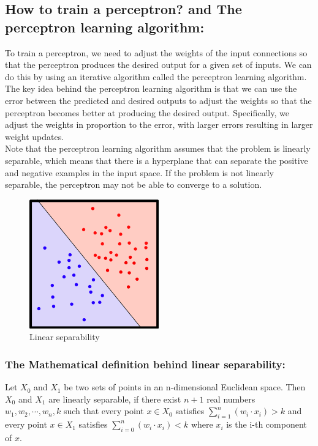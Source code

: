 \documentclass[12pt]{article}
\begin{document}
\subsection{How to train a perceptron? and The perceptron learning algorithm:}
To train a perceptron, we need to adjust the weights of the input connections so that the
perceptron produces the desired output for a given set of inputs. We can do this by using an
iterative algorithm called the perceptron learning algorithm.\\
The key idea behind the perceptron learning algorithm is that we can use the error between the
predicted and desired outputs to adjust the weights so that the perceptron becomes better at
producing the desired output. Specifically, we adjust the weights in proportion to the error, with
larger errors resulting in larger weight updates.\\
Note that the perceptron learning algorithm assumes that the problem is linearly separable, which
means that there is a hyperplane that can separate the positive and negative examples in the input
space. If the problem is not linearly separable, the perceptron may not be able to converge to a
solution.\\
\begin{figure}[h]
  \centering
  \includegraphics{linearly.png}
  \caption{Linear separability}
\end{figure}
\subsubsection{The Mathematical definition behind linear separability:}
Let $X_0$ and $X_1$ be two sets of points in an n-dimensional Euclidean space. Then $X_0$ and $X_1$
are linearly separable, if there exist $n + 1$ real numbers $w_1, w_2, \cdots, w_n, k$ such that
every point $x \in X_0$ satisfies $\sum_{i = 1}^{n}(w_i \cdot x_i) > k$ and every point $x \in X_1$
satisfies
$\sum_{i = 0}^{n}(w_i \cdot x_i) < k$ where $x_i$ is the i-th component of $x$.
\end{document}

